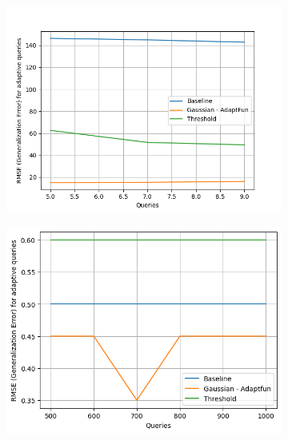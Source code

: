 {\small
\begin{figure}
\centering
\begin{subfigure}{.322\textwidth}
\begin{centering}
\includegraphics[width=1.0\textwidth]{n_adaptivity.png}
\caption{}
\end{centering}
\end{subfigure}
\quad
\begin{subfigure}{.322\textwidth}
\begin{centering}
\includegraphics[width=1.0\textwidth]{nm_adaptivity.png}
\caption{}
\end{centering}
\end{subfigure}
\begin{subfigure}{.322\textwidth}

\end{subfigure}
\end{figure}}
